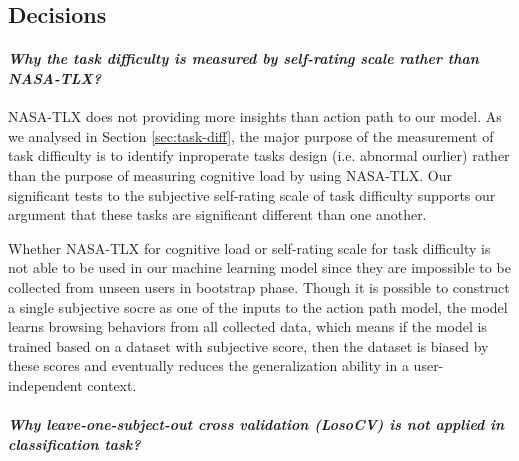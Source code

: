 \subsection{Decisions}

\paragraph{\emph{Why the task difficulty is measured by self-rating scale rather than NASA-TLX?}}


NASA-TLX does not providing more insights than action path to our model.
As we analysed in Section \ref{sec:task-diff}, the major purpose of the measurement of 
task difficulty is to identify inproperate tasks design (i.e. abnormal ourlier) 
rather than the purpose of measuring cognitive load by using NASA-TLX.
Our significant tests to the subjective self-rating scale of task difficulty supports
our argument that these tasks are significant different than one another.

Whether NASA-TLX for cognitive load or self-rating scale for task difficulty is not able to be used in
our machine learning model since they are impossible to be collected from unseen users in bootstrap phase.
Though it is possible to construct a single subjective socre as one of the inputs to the action path model,
the model learns browsing behaviors from all collected data, which means if the model is trained based on 
a dataset with subjective score, then the dataset is biased by these scores and eventually reduces the 
generalization ability in a user-independent context.

\paragraph{\emph{Why leave-one-subject-out cross validation (LosoCV) is not applied in classification task?}}


